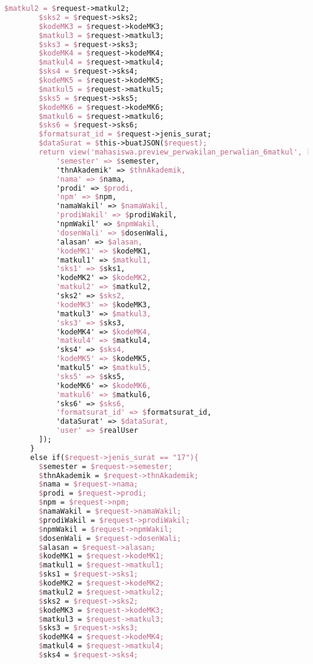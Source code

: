 \begin{lstlisting}[language=tex,basicstyle=\tiny,caption=PesanansuratController.php]
        $matkul2 = $request->matkul2;
        $sks2 = $request->sks2;
        $kodeMK3 = $request->kodeMK3;
        $matkul3 = $request->matkul3;
        $sks3 = $request->sks3;
        $kodeMK4 = $request->kodeMK4;
        $matkul4 = $request->matkul4;
        $sks4 = $request->sks4;
        $kodeMK5 = $request->kodeMK5;
        $matkul5 = $request->matkul5;
        $sks5 = $request->sks5;
        $kodeMK6 = $request->kodeMK6;
        $matkul6 = $request->matkul6;
        $sks6 = $request->sks6;
        $formatsurat_id = $request->jenis_surat;
        $dataSurat = $this->buatJSON($request);
        return view('mahasiswa.preview_perwakilan_perwalian_6matkul', [
            'semester' => $semester,
            'thnAkademik' => $thnAkademik,
            'nama' => $nama,
            'prodi' => $prodi,
            'npm' => $npm,
            'namaWakil' => $namaWakil,
            'prodiWakil' => $prodiWakil,
            'npmWakil' => $npmWakil,
            'dosenWali' => $dosenWali,
            'alasan' => $alasan,
            'kodeMK1' => $kodeMK1,
            'matkul1' => $matkul1,
            'sks1' => $sks1,
            'kodeMK2' => $kodeMK2,
            'matkul2' => $matkul2,
            'sks2' => $sks2,
            'kodeMK3' => $kodeMK3,
            'matkul3' => $matkul3,
            'sks3' => $sks3,
            'kodeMK4' => $kodeMK4,
            'matkul4' => $matkul4,
            'sks4' => $sks4,
            'kodeMK5' => $kodeMK5,
            'matkul5' => $matkul5,
            'sks5' => $sks5,
            'kodeMK6' => $kodeMK6,
            'matkul6' => $matkul6,
            'sks6' => $sks6,
            'formatsurat_id' => $formatsurat_id,
            'dataSurat' => $dataSurat,
            'user' => $realUser
        ]);
      }
      else if($request->jenis_surat == "17"){
        $semester = $request->semester;
        $thnAkademik = $request->thnAkademik;
        $nama = $request->nama;
        $prodi = $request->prodi;
        $npm = $request->npm;
        $namaWakil = $request->namaWakil;
        $prodiWakil = $request->prodiWakil;
        $npmWakil = $request->npmWakil;
        $dosenWali = $request->dosenWali;
        $alasan = $request->alasan;
        $kodeMK1 = $request->kodeMK1;
        $matkul1 = $request->matkul1;
        $sks1 = $request->sks1;
        $kodeMK2 = $request->kodeMK2;
        $matkul2 = $request->matkul2;
        $sks2 = $request->sks2;
        $kodeMK3 = $request->kodeMK3;
        $matkul3 = $request->matkul3;
        $sks3 = $request->sks3;
        $kodeMK4 = $request->kodeMK4;
        $matkul4 = $request->matkul4;
        $sks4 = $request->sks4;

\end{lstlisting}
